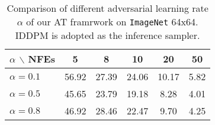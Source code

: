 
\begin{table*}[t!]
\centering
\caption{Comparison of different adversarial learning rate $\alpha$ of our AT framrwork on \texttt{ImageNet} 64x64. IDDPM is adopted as the inference sampler.}
\begin{tabular}{lccccc}
\toprule
   $\alpha$ $\backslash$ NFEs & 5 & 8 & 10 & 20 & 50 \\ 
    \midrule
    $\alpha=0.1$ & 56.92 & 27.39 & 24.06  & 10.17 & 5.82  \\
    $\alpha=0.5$ & 45.65 & 23.79 & 19.18 & 8.28 & 4.01 \\
    $\alpha=0.8$ & 46.92 & 28.46 & 22.47 & 9.70 & 4.25 \\
    \bottomrule
    \end{tabular}
\label{tab:alr_ablation_i64}
\end{table*}

